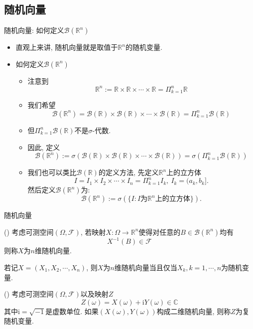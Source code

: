 \subsection{随机向量}

\begin{frame}{随机向量: 如何定义$\mathcal{B}(\mathbb{R}^n)$}
\begin{itemize}
	\item 直观上来讲, 随机向量就是取值于$\mathbb{R}^n$的随机变量.
	\item 如何定义$\mathcal{B}(\mathbb{R}^n)$
	\begin{itemize}[<+-|alert@+>]
		\item 注意到$$\mathbb{R}^n:=\mathbb{R}\times \mathbb{R}\times\cdots\times \mathbb{R}=\Pi_{k=1}^n\mathbb{R}$$
		\item 我们希望
		\[\mathcal{B}(\mathbb{R}^n)=\mathcal{B}(\mathbb{R})\times \mathcal{B}(\mathbb{R})\times\cdots\times\mathcal{B}(\mathbb{R})=\Pi_{k=1}^n\mathcal{B}(\mathbb{R})\]
		\item 但$\Pi_{k=1}^n\mathcal{B}(\mathbb{R})$不是$\sigma$-代数.
		\item 因此, 定义
		\[\mathcal{B}(\mathbb{R}^n):=\sigma(\mathcal{B}(\mathbb{R})\times \mathcal{B}(\mathbb{R})\times\cdots\times\mathcal{B}(\mathbb{R}))=\sigma(\Pi_{k=1}^n\mathcal{B}(\mathbb{R}))\]
		\item 我们也可以类比$\mathcal{B}(\mathbb{R})$的定义方法, 先定义$\mathbb{R}^n$上的立方体
		$$I=I_1\times I_2\times\cdots\times I_n=\Pi_{k=1}^nI_k, \ I_k=(a_k, b_k].$$ 然后定义$\mathcal{B}(\mathbb{R}^n)$为:
		\[\mathcal{B}(\mathbb{R}^n):=\sigma(\{I:I\mbox{为}\mathbb{R}^n\mbox{上的立方体}\}).\]%
	\end{itemize}

\end{itemize}

\end{frame}

\begin{frame}{随机向量}
\begin{defi}
() 考虑可测空间$(\Omega,\mathcal{F})$, 若映射$X: \Omega \rightarrow \mathbb{R}^{n}$使得对任意的$B \in \mathcal{B}(\mathbb{R}^{n})$均有
	\[
	X^{-1}(B) \in \mathcal{F}
	\]
则称$X$为$n$维随机向量.
\end{defi}
\pause
\begin{rmk}
若记$X=(X_1, X_2,\cdots, X_n)$, 则$X$为$n$维随机向量当且仅当$X_k, k=1,\cdots,n$为随机变量.
\end{rmk}

\pause
\begin{defi}
() 考虑可测空间$(\Omega,\mathcal{F})$以及映射$Z$
\[
Z(\omega)=X(\omega)+\mathrm{i} Y(\omega) \in \mathbb{C}
\]
其中$\mathrm{i}=\sqrt{-1}$是虚数单位. 如果$(X(\omega), Y(\omega))$构成二维随机向量, 则称$Z$为复随机变量.
\end{defi}

\end{frame}


